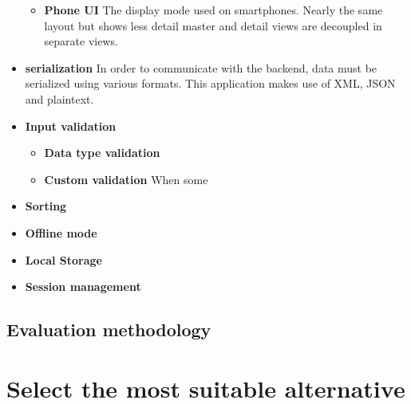 \begin{itemize}
\begin{itemize}
        \item \textbf{Phone UI} The display mode used on smartphones. Nearly the same layout but shows less detail master and detail views are decoupled in separate views.
    \end{itemize}
    \item \textbf{serialization} In order to communicate with the backend,  data must be serialized using various formats. This application makes use of XML, JSON and plaintext.
    \item \textbf{Input validation}
    \begin{itemize}
        \item \textbf{Data type validation} 
        \item \textbf{Custom validation} When some  
    \end{itemize}
    \item \textbf{Sorting}
    \item \textbf{Offline mode}
    \item \textbf{Local Storage}
    \item \textbf{Session management}
\end{itemize}

\subsection{Evaluation methodology}
\label{sec:evaluation-method}

\section{Select the most suitable alternative}













